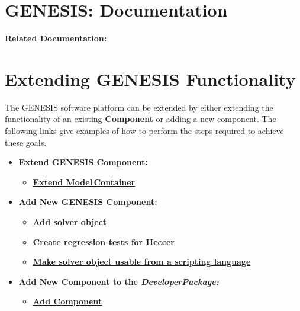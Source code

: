 \documentclass[12pt]{article}
\begin{document}
\section*{GENESIS: Documentation}

{\bf Related Documentation:}

\section*{Extending GENESIS Functionality}

The GENESIS software platform can be extended by either extending the functionality of an existing \href{../reserved-words/reserved-words.tex}{\bf Component} or adding a new component. The following links give examples of how to perform the steps required to achieve these goals.

\begin{itemize}
   \item[]{\bf Extend GENESIS Component:}
      \begin{itemize}
         \item[]\href{../genesis-extend-model-container/genesis-extend-model-container.tex}{\bf Extend Model\,Container}
      \end{itemize}
      
   \item[]{\bf Add New GENESIS Component:}
      \begin{itemize}
         \item[]\href{../genesis-add-object-solver/genesis-add-object-solver.tex}{\bf Add solver object}
         \item[]\href{../genesis-create-test-heccer/genesis-create-test-heccer.tex}{\bf Create regression tests for Heccer}
         \item[]\href{../genesis-add-swigbinding-heccer/genesis-add-swigbinding-heccer.tex}{\bf Make solver object usable from a scripting language}
      \end{itemize}
      
   \item[]{\bf Add New Component to the {\it DeveloperPackage:}}
      \begin{itemize}
         \item[]\href{../genesis-addto-component-developerpackage/genesis-addto-component-developerpackage.tex}{\bf Add Component}
      \end{itemize} 
\end{itemize}
\end{document}
